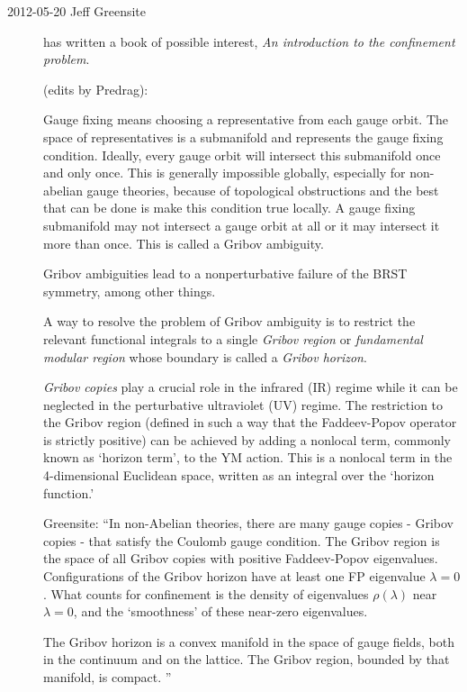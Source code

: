 \begin{description}
\item[2012-05-20 Jeff Greensite] has written a book of
possible interest, \emph{An introduction to the confinement problem}.

(edits by Predrag):

Gauge fixing means choosing a representative from each gauge orbit. The
space of representatives is a submanifold and represents the gauge fixing
condition. Ideally, every gauge orbit will intersect this submanifold
once and only once. This is generally impossible globally, especially for
non-abelian gauge theories, because of topological obstructions and the
best that can be done is make this condition true locally. A gauge fixing
submanifold may not intersect a gauge orbit at all or it may intersect it
more than once. This is called a Gribov ambiguity.

Gribov ambiguities lead to a nonperturbative failure of the BRST
symmetry, among other things.

A way to resolve the problem of Gribov ambiguity is to restrict the
relevant functional integrals to a single \emph{Gribov region} or {\em
fundamental modular region} whose boundary is called a \emph{Gribov
horizon}.

{\em Gribov copies} play a crucial role in the infrared (IR) regime while
it can be neglected in the perturbative ultraviolet (UV)
regime. The restriction to the Gribov region
(defined in such a way that the Faddeev-Popov operator is strictly
positive) can be achieved by adding a nonlocal term, commonly known as
`horizon term', to the YM action. This is a
nonlocal term in the 4-dimensional Euclidean space, written as an
integral over the `horizon function.'

Greensite: ``In non-Abelian theories, there are many gauge copies -
Gribov copies - that satisfy the Coulomb gauge condition. The Gribov
region is the space of all Gribov copies with positive Faddeev-Popov
eigenvalues. Configurations of the Gribov horizon have at least one FP
eigenvalue $\lambda =0$. What counts for confinement is the density of
eigenvalues $\rho(\lambda)$ near $\lambda =0$, and the `smoothness' of
these near-zero eigenvalues.

The Gribov horizon is a convex manifold in the space of gauge fields,
both in the continuum and on the lattice. The Gribov region, bounded by
that manifold, is compact.
''


\end{description}
